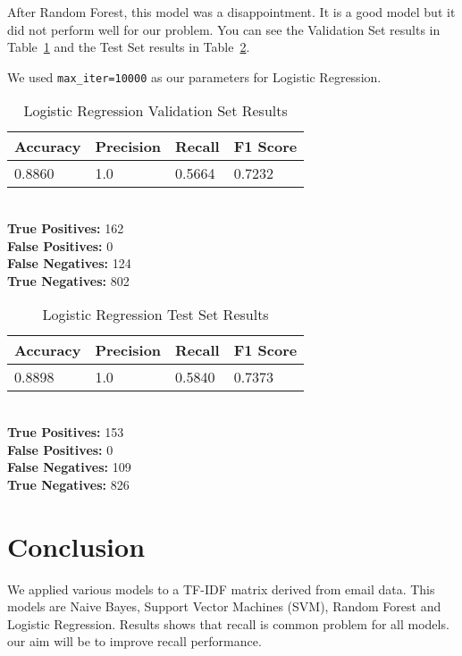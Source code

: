 \documentclass[conference]{IEEEtran}
\begin{document}
After Random Forest, this model was a disappointment. It is a good model but it did not perform well for our problem. You can see the Validation Set results in Table \ref{tab:lr1} and the Test Set results in Table \ref{tab:lr2}.

We used \verb|max_iter=10000| as our parameters for Logistic Regression.

\begin{table}[H]
    \caption{Logistic Regression Validation Set Results}

    \begin{tabularx}{\linewidth}{|X|X|X|X|}
        \hline
        \textbf{Accuracy} & \textbf{Precision} & \textbf{Recall} & \textbf{F1 Score} \\
        \hline
        0.8860 & 1.0 & 0.5664 & 0.7232 \\
        \hline
    \end{tabularx}\\

    \textbf{True Positives:} 162\\
    \textbf{False Positives:} 0\\
    \textbf{False Negatives:} 124\\
    \textbf{True Negatives:} 802
    \label{tab:lr1}
\end{table}

\begin{table}[H]
    \caption{Logistic Regression Test Set Results}

    \begin{tabularx}{\linewidth}{|X|X|X|X|}
        \hline
        \textbf{Accuracy} & \textbf{Precision} & \textbf{Recall} & \textbf{F1 Score} \\
        \hline
        0.8898 & 1.0 & 0.5840 & 0.7373 \\
        \hline
    \end{tabularx}\\

    \textbf{True Positives:} 153\\
    \textbf{False Positives:} 0\\
    \textbf{False Negatives:} 109\\
    \textbf{True Negatives:} 826
    \label{tab:lr2}
\end{table}

\section{Conclusion}
We applied various models to a TF-IDF matrix derived from email data. This models are Naive
Bayes, Support Vector Machines (SVM), Random Forest and Logistic Regression. Results shows that recall is common problem for all models. our aim will be to improve recall performance. 
\end{document}
